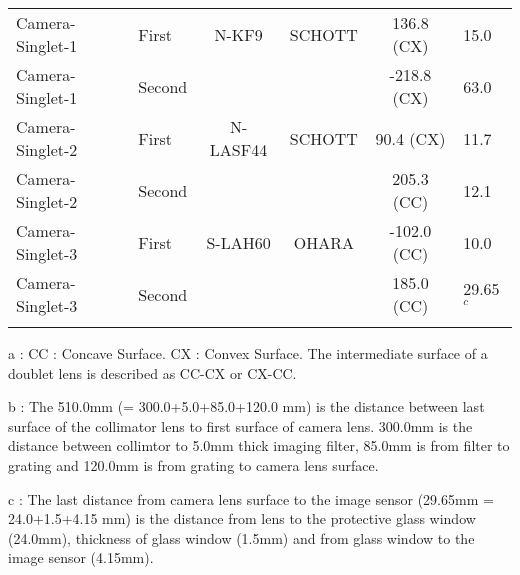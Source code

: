 \begin{table}
\begin{tabular}{p{3.0cm}lcccp{2.3cm}}
		Camera-Singlet-1     & First  & N-KF9    & SCHOTT &  136.8 (CX)    & 15.0    \\
		Camera-Singlet-1     & Second &          &        & -218.8 (CX)    & 63.0    \\
		Camera-Singlet-2     & First  & N-LASF44 & SCHOTT &  90.4 (CX)     & 11.7  \\
		Camera-Singlet-2     & Second &          &        &  205.3 (CC)    & 12.1  \\
		Camera-Singlet-3     & First  & S-LAH60  & OHARA  & -102.0 (CC)      & 10.0    \\
		Camera-Singlet-3     & Second &          &        &  185.0 (CC)      & 29.65$^{c}$   \\
		\hline
		\hline
		\vspace{-0.2cm}
	\end{tabular}
	\label{table-OpticsData}
	\begin{list}{}{}
		\item a : CC : Concave Surface. CX : Convex Surface. The intermediate surface of a doublet lens is described as CC-CX or CX-CC.
		\item b : The 510.0mm (= 300.0+5.0+85.0+120.0 mm) is the distance between last surface of the collimator lens to first surface of camera lens. 300.0mm is the distance between collimtor to 5.0mm thick imaging filter, 85.0mm is from filter to grating and 120.0mm is from grating to camera lens surface.
		\item c : The last distance from camera lens surface to the image sensor (29.65mm = 24.0+1.5+4.15 mm) is the distance from lens to the protective glass window (24.0mm), thickness of glass window (1.5mm) and from glass window to the image sensor (4.15mm).
	\end{list}
\end{table}


